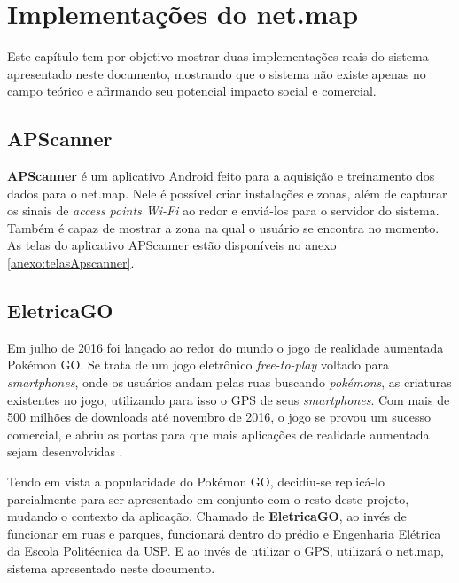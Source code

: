 \chapter{Implementações do net.map}\label{chp:implementations}

Este capítulo tem por objetivo mostrar duas implementações reais do sistema apresentado neste documento, mostrando que o sistema não existe apenas no campo teórico e afirmando seu potencial impacto social e comercial.

\section{APScanner}

\textbf{APScanner} é um aplicativo Android feito para a aquisição e treinamento dos dados para o net.map. Nele é possível criar instalações e zonas, além de capturar os sinais de \textit{access points Wi-Fi} ao redor e enviá-los para o servidor do sistema. Também é capaz de mostrar a zona na qual o usuário se encontra no momento.
\\
As telas do aplicativo APScanner estão disponíveis no anexo \ref{anexo:telasApscanner}.

\section{EletricaGO}

Em julho de 2016 foi lançado ao redor do mundo o jogo de realidade aumentada Pokémon GO. Se trata de um jogo eletrônico \textit{free-to-play} voltado para \textit{smartphones}, onde os usuários andam pelas ruas buscando \textit{pokémons}, as criaturas existentes no jogo, utilizando para isso o GPS de seus \textit{smartphones}. Com mais de 500 milhões de downloads até novembro de 2016, o jogo se provou um sucesso comercial, e abriu as portas para que mais aplicações de realidade aumentada sejam desenvolvidas \cite{dapokemon}.
\par
Tendo em vista a popularidade do Pokémon GO, decidiu-se replicá-lo parcialmente para ser apresentado em conjunto com o resto deste projeto, mudando o contexto da aplicação. Chamado de \textbf{EletricaGO}, ao invés de funcionar em ruas e parques, funcionará dentro do prédio e Engenharia Elétrica da Escola Politécnica da USP. E ao invés de utilizar o GPS, utilizará o net.map, sistema apresentado neste documento.
